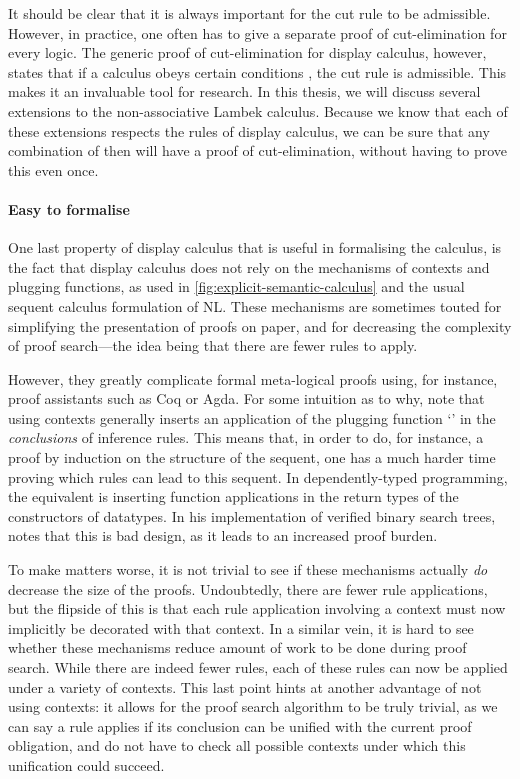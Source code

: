 \documentclass[a4paper]{article}
\begin{document}
It should be clear that it is always important for the cut rule to be
admissible. However, in practice, one often has to give a separate
proof of cut-elimination for every logic. The generic proof of
cut-elimination for display calculus, however, states that if a
calculus obeys certain conditions \citep[see][]{gore1998}, the cut
rule is admissible.
This makes it an invaluable tool for research. In this thesis, we will
discuss several extensions to the non-associative Lambek calculus.
Because we know that each of these extensions respects the rules of
display calculus, we can be sure that any combination of then will
have a proof of cut-elimination, without having to prove this even
once.

\paragraph{Easy to formalise}
One last property of display calculus that is useful in formalising
the calculus, is the fact that display calculus does not rely on the
mechanisms of contexts and plugging functions, as used in
\autoref{fig:explicit-semantic-calculus} and the usual sequent
calculus formulation of NL.
These mechanisms are sometimes touted for simplifying the presentation
of proofs on paper, and for decreasing the complexity of proof
search---the idea being that there are fewer rules to apply.

However, they greatly complicate formal meta-logical proofs using, for
instance, proof assistants such as Coq or Agda.
For some intuition as to why, note that using contexts generally
inserts an application of the plugging function `\plug' in the
\emph{conclusions} of inference rules. This means that, in order to
do, for instance, a proof by induction on the structure of the
sequent, one has a much harder time proving which rules can lead to
this sequent.
In dependently-typed programming, the equivalent is inserting
function applications in the return types of the constructors of
datatypes. In his implementation of verified binary search trees,
\citet{mcbride2014} notes that this is bad design, as it leads to an
increased proof burden.

To make matters worse, it is not trivial to see if these mechanisms
actually \emph{do} decrease the size of the proofs. Undoubtedly, there
are fewer rule applications, but the flipside of this is that each
rule application involving a context must now implicitly be decorated
with that context.
In a similar vein, it is hard to see whether these mechanisms reduce
amount of work to be done during proof search. While there are indeed
fewer rules, each of these rules can now be applied under a variety of
contexts.
This last point hints at another advantage of not using contexts: it
allows for the proof search algorithm to be truly trivial, as we can
say a rule applies if its conclusion can be unified with the current
proof obligation, and do not have to check all possible contexts under
which this unification could succeed.
\end{document}
